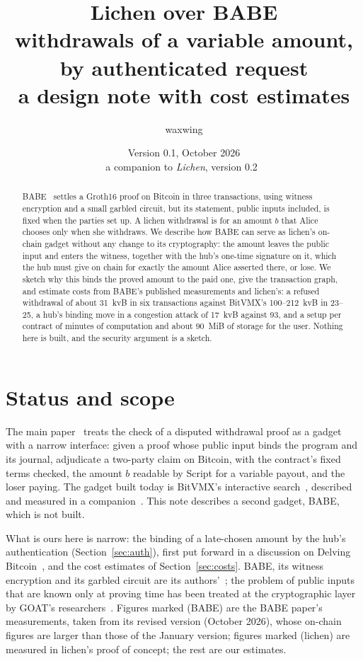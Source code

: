 \documentclass[11pt]{article}
\title{\textbf{Lichen over BABE}\\withdrawals of a variable amount, by authenticated request\\[2pt]\large a design note with cost estimates}
\author{waxwing}
\date{Version 0.1, October 2026\\[2pt]\small a companion to \emph{Lichen}, version 0.2~\cite{lichen}}
\begin{document}
\maketitle

\begin{abstract}
BABE~\cite{babe} settles a Groth16 proof on Bitcoin in three
transactions, using witness encryption and a small garbled circuit, but
its statement, public inputs included, is fixed when the parties set up.
A lichen withdrawal is for an amount $b$ that Alice chooses only when she
withdraws. We describe how BABE can serve as lichen's on-chain gadget
without any change to its cryptography: the amount leaves the public
input and enters the witness, together with the hub's one-time signature
on it, which the hub must give on chain for exactly the amount Alice
asserted there, or lose. We sketch why this binds the proved amount to
the paid one, give the transaction graph, and estimate costs from BABE's
published measurements and lichen's: a refused withdrawal of about
31~kvB in six transactions against BitVMX's 100--212~kvB in 23--25, a
hub's binding move in a congestion attack of 17~kvB against 93, and a
setup per contract of minutes of computation and about 90~MiB of storage
for the user. Nothing here is built, and the security argument is a
sketch.
\end{abstract}

\tableofcontents

\section{Status and scope}
\label{sec:status}

The main paper~\cite{lichen} treats the check of a disputed withdrawal
proof as a gadget with a narrow interface: given a proof whose public
input binds the program and its journal, adjudicate a two-party claim
on Bitcoin, with the contract's fixed terms checked, the amount $b$
readable by Script for a variable payout, and the loser paying. The
gadget built today is BitVMX's interactive search~\cite{bitvmx},
described and measured in a companion~\cite{lichenbitvmx}. This note
describes a second gadget, BABE, which is not built.

What is ours here is narrow: the binding of a late-chosen amount by the
hub's authentication (Section~\ref{sec:auth}), first put forward in a
discussion on Delving Bitcoin~\cite{delving}, and the cost estimates of
Section~\ref{sec:costs}. BABE, its witness encryption and its garbled
circuit are its authors'~\cite{babe,gkpw24,argo}; the problem of public
inputs that are known only at proving time has been treated at the
cryptographic layer by GOAT's researchers~\cite{goat}. Figures marked
(BABE) are the BABE paper's measurements, taken from its revised version
(October 2026), whose on-chain figures are larger than those of the
January version; figures marked (lichen) are measured in lichen's proof
of concept; the rest are our estimates.
\end{document}
